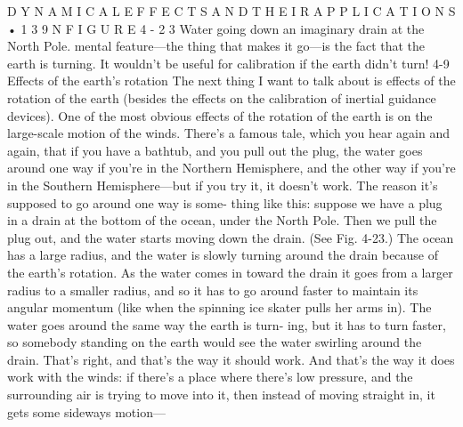 \documentclass[10pt,oneside]{article}
\begin{document}
D Y N A M I C A L  E F F E C T S  A N D  T H E I R  A P P L I C A T I O N S • 1 3 9 N F I G U R E  4 - 2 3 Water going down an imaginary drain at the North Pole. mental feature---the thing that makes it go---is the fact that the earth is turning. It wouldn’t be useful for calibration if the earth didn’t turn! 4-9 Effects of the earth’s rotation The next thing I want to talk about is effects of the rotation of the earth (besides the effects on the calibration of inertial guidance devices). One of the most obvious effects of the rotation of the earth is on the large-scale motion of the winds. There’s a famous tale, which you hear again and again, that if you have a bathtub, and you pull out the plug, the water goes around one way if you’re in the Northern Hemisphere, and the other way if you’re in the Southern Hemisphere---but if you try it, it doesn’t work. The reason it’s supposed to go around one way is some- thing like this: suppose we have a plug in a drain at the bottom of the ocean, under the North Pole. Then we pull the plug out, and the water starts moving down the drain. (See Fig. 4-23.) The ocean has a large radius, and the water is slowly turning around the drain because of the earth’s rotation. As the water comes in toward the drain it goes from a larger radius to a smaller radius, and so it has to go around faster to maintain its angular momentum (like when the spinning ice skater pulls her arms in). The water goes around the same way the earth is turn- ing, but it has to turn faster, so somebody standing on the earth would see the water swirling around the drain. That’s right, and that’s the way it should work. And that’s the way it does work with the winds: if there’s a place where there’s low pressure, and the surrounding air is trying to move into it, then instead of moving straight in, it gets some sideways motion---\par
\end{document}
